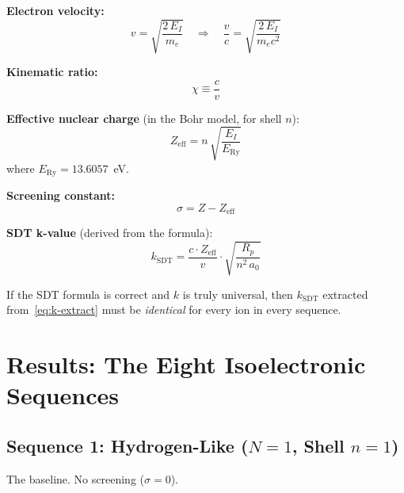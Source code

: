 \textbf{Electron velocity:}
\begin{equation}
  v = \sqrt{\frac{2\,E_I}{m_e}} \quad\Rightarrow\quad \frac{v}{c} = \sqrt{\frac{2\,E_I}{m_e c^2}}
\end{equation}

\textbf{Kinematic ratio:}
\begin{equation}
  \chi \equiv \frac{c}{v}
\end{equation}

\textbf{Effective nuclear charge} (in the Bohr model, for shell $n$):
\begin{equation}\label{eq:Z-eff}
  Z_{\text{eff}} = n\,\sqrt{\frac{E_I}{E_{\text{Ry}}}}
\end{equation}
where $E_{\text{Ry}} = 13.6057$~eV.

\textbf{Screening constant:}
\begin{equation}
  \sigma = Z - Z_{\text{eff}}
\end{equation}

\textbf{SDT k-value} (derived from the formula):
\begin{equation}\label{eq:k-extract}
  k_{\text{SDT}} = \frac{c \cdot Z_{\text{eff}}}{v} \cdot \sqrt{\frac{R_p}{n^2\,a_0}}
\end{equation}

If the SDT formula is correct and $k$ is truly universal, then $k_{\text{SDT}}$ extracted from~\eqref{eq:k-extract} must be \emph{identical} for every ion in every sequence.


\section{Results: The Eight Isoelectronic Sequences}

\subsection{Sequence 1: Hydrogen-Like ($N = 1$, Shell $n = 1$)}

The baseline.  No screening ($\sigma = 0$).

